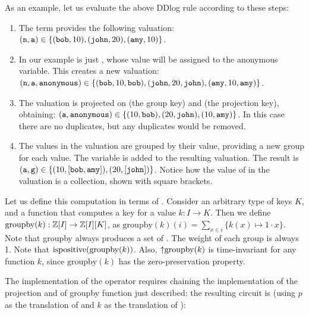 As an example, let us evaluate the above DDlog rule according to these steps:

\begin{enumerate}
    \item The term  provides the following valuation: \\
    $(\mbox{\texttt{n}},\mbox{\texttt{a}}) \in \{ (\mbox{\texttt{bob}}, 10), (\mbox{\texttt{john}}, 20), (\mbox{\texttt{amy}}, 10) \}$.
    \item In our example  is just , whose value
    will be assigned to the anonymous variable.  This creates a new valuation: \\
    $(\mbox{\texttt{n}},\mbox{\texttt{a}}, \mbox{\texttt{anonymous}}) \in \{ (\mbox{\texttt{bob}}, 10, \mbox{\texttt{bob}}), 
    (\mbox{\texttt{john}}, 20, \mbox{\texttt{john}}),  (\mbox{\texttt{amy}}, 10, \mbox{\texttt{amy}}) \}$.
    \item The valuation is projected on  (the group key) and 
    (the projection key), obtaining:
    $(\mbox{\texttt{a}}, \mbox{\texttt{anonymous}}) \in \{ (10, \mbox{\texttt{bob}}), (20, \mbox{\texttt{john}}),  (10, \mbox{\texttt{amy}}) \}$.
    In this case there are no duplicates, but any duplicates would be removed.
    \item The values in the valuation are grouped by their  value, providing
    a new group for each value.  The variable  is added to the resulting valuation.
    The result is $(\mbox{\texttt{a}}, \mbox{\texttt{g}}) \in \{ (10, [\mbox{\texttt{bob}}, \mbox{\texttt{amy}}]), (20, [\mbox{\texttt{john}}]) \}$.
    Notice how the value of  in the valuation is a collection, shown with square brackets.
\end{enumerate}

Let us define this computation in terms of \zrs.  Consider an arbitrary type of 
keys $K$, and a function that computes a key for a value $k: I \rightarrow K$.  
Then we define $\mbox{groupby}(k): \mathbb{Z}[I] \rightarrow \mathbb{Z}[I][K]$, as
$\mbox{groupby}(k)(i) = \sum_{x \in i} \{ k(x) \mapsto 1 \cdot x \}$.
Note that groupby always produces a set of \zrs.  The weight of each group
is always 1.  Note that $\mbox{ispositive}(\mbox{groupby}(k))$.  Also, ${\uparrow}\mbox{groupby}(k)$
is time-invariant for any function $k$, since $\mbox{groupby}(k)$ has the zero-preservation
property.
 
The implementation of the  operator requires chaining the implementation of the
projection and of groupby function just described:
the resulting circuit is (using $p$ as the translation of  and $k$ as
the translation of ):

